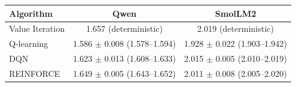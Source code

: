 \begin{tabular}{@{}lcc@{}}
\toprule
Algorithm & Qwen & SmolLM2 \\
\midrule
Value Iteration & 1.657 (deterministic) & 2.019 (deterministic) \\
Q-learning & 1.586 $\pm$ 0.008 (1.578--1.594) & 1.928 $\pm$ 0.022 (1.903--1.942) \\
DQN & 1.623 $\pm$ 0.013 (1.608--1.633) & 2.015 $\pm$ 0.005 (2.010--2.019) \\
REINFORCE & 1.649 $\pm$ 0.005 (1.643--1.652) & 2.011 $\pm$ 0.008 (2.005--2.020) \\
\bottomrule
\end{tabular}